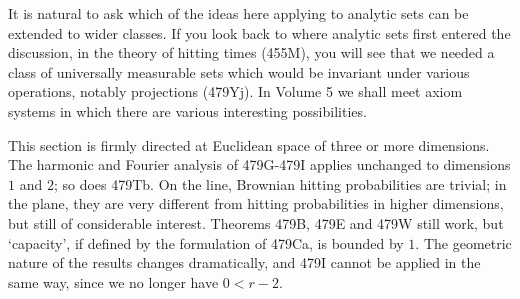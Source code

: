 {It is natural to ask which of the ideas here applying to analytic sets
can be extended to wider classes.   If you look back
to where analytic sets first entered the discussion, in the theory of
hitting times
(455M), you will see that we needed a class of universally measurable
sets which would be invariant under various operations, notably
projections (479Yj).   In Volume 5 we shall meet axiom systems in which
there are various interesting possibilities.

This section is firmly directed at Euclidean space of three or more
dimensions.
The harmonic and Fourier analysis of 479G-479I %
applies unchanged to dimensions $1$ and $2$;  so does 479Tb.
On the line, Brownian
hitting probabilities are trivial;  in the plane, they are very
different from hitting probabilities in higher dimensions, but still of
considerable interest.   Theorems 479B, 479E and 479W still work,
but `capacity', if defined by the formulation of 479Ca, is bounded by
$1$.   The geometric nature of
the results changes dramatically, and 479I cannot be applied in the
same way, since we no longer have $0<r-2$.
}%

\discrpage

